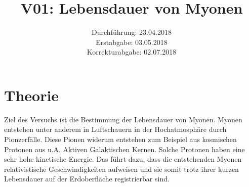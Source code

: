 \documentclass[
  bibliography=totoc,     %
  captions=tableheading,  %
  titlepage=firstiscover, %
]{scrartcl}
\title{V01: Lebensdauer von Myonen}
\author{
  Simon Schulte
  \texorpdfstring{
    \\
    \href{mailto:simon.schulte@udo.edu}{simon.schulte@udo.edu}
  }{}
  \texorpdfstring{\and}{, }
  Tim Sedlaczek
  \texorpdfstring{
    \\
    \href{mailto:tim.sedlaczek@udo.edu}{tim.sedlaczek@udo.edu}
  }{}
}
\date{Durchführung: 23.04.2018\\
      Erstabgabe: 03.05.2018\\
      Korrekturabgabe: 02.07.2018}
\begin{document}
\maketitle
\thispagestyle{empty}
\setcounter{page}{1}
\section{Theorie}
\label{sec:theorie}
  Ziel des Versuchs ist die Bestimmung der Lebensdauer von Myonen. Myonen
  entstehen unter anderem in Luftschauern in der Hochatmosphäre durch
  Pionzerfälle. Diese Pionen widerum entstehen zum Beispiel aus kosmischen
  Protonen aus u.A. Aktiven Galaktischen Kernen. Solche Protonen haben eine sehr
  hohe kinetische Energie. Das führt dazu, dass die entstehenden Myonen
  relativistische Geschwindigkeiten aufweisen und sie somit trotz ihrer kurzen
  Lebensdauer auf der Erdoberfläche registrierbar sind.
\end{document}
